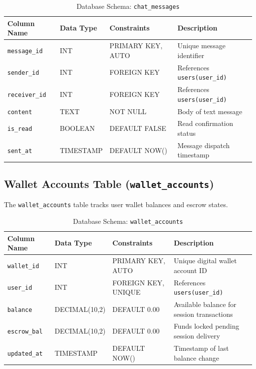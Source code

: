 \documentclass[12pt,a4paper]{report}
\begin{document}
\begin{table}[H]
\centering
\small
\caption{Database Schema: \texttt{chat\_messages}}
\label{tab:schema_chat_messages}
\begin{tabularx}{\textwidth}{|L{3.0cm}|L{2.8cm}|L{2.5cm}|J|}
\hline
\textbf{Column Name} & \textbf{Data Type} & \textbf{Constraints} & \textbf{Description} \\ \hline
\texttt{message\_id} & INT & PRIMARY KEY, AUTO & Unique message identifier \\ \hline
\texttt{sender\_id} & INT & FOREIGN KEY & References \texttt{users(user\_id)} \\ \hline
\texttt{receiver\_id} & INT & FOREIGN KEY & References \texttt{users(user\_id)} \\ \hline
\texttt{content} & TEXT & NOT NULL & Body of text message \\ \hline
\texttt{is\_read} & BOOLEAN & DEFAULT FALSE & Read confirmation status \\ \hline
\texttt{sent\_at} & TIMESTAMP & DEFAULT NOW() & Message dispatch timestamp \\ \hline
\end{tabularx}
\end{table}

\subsection{Wallet Accounts Table (\texttt{wallet\_accounts})}
The \texttt{wallet\_accounts} table tracks user wallet balances and escrow states.

\begin{table}[H]
\centering
\small
\caption{Database Schema: \texttt{wallet\_accounts}}
\label{tab:schema_wallet_accounts}
\begin{tabularx}{\textwidth}{|L{3.0cm}|L{2.8cm}|L{2.5cm}|J|}
\hline
\textbf{Column Name} & \textbf{Data Type} & \textbf{Constraints} & \textbf{Description} \\ \hline
\texttt{wallet\_id} & INT & PRIMARY KEY, AUTO & Unique digital wallet account ID \\ \hline
\texttt{user\_id} & INT & FOREIGN KEY, UNIQUE & References \texttt{users(user\_id)} \\ \hline
\texttt{balance} & DECIMAL(10,2) & DEFAULT 0.00 & Available balance for session transactions \\ \hline
\texttt{escrow\_bal} & DECIMAL(10,2) & DEFAULT 0.00 & Funds locked pending session delivery \\ \hline
\texttt{updated\_at} & TIMESTAMP & DEFAULT NOW() & Timestamp of last balance change \\ \hline
\end{tabularx}
\end{table}
\end{document}
